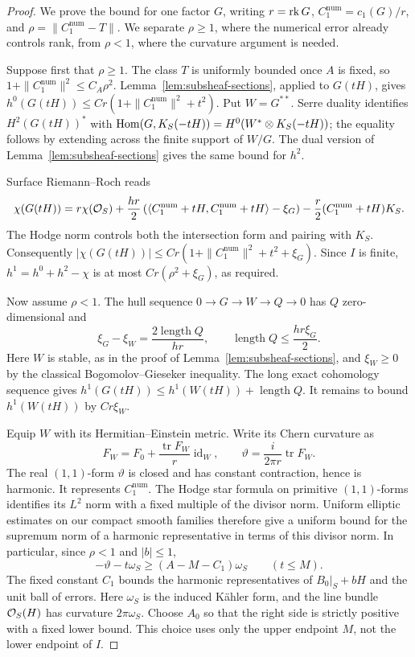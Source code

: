\begin{proof}
We prove the bound for one factor $G$, writing
$r=\operatorname{rk} G$, $C_1^{\mathrm{num}}=c_1(G)/r$, and
$\rho=\|C_1^{\mathrm{num}}-T\|$.  We separate $\rho\ge1$,
where the numerical error already controls rank, from $\rho<1$,
where the curvature argument is needed.

Suppose first that $\rho\ge1$.  The class $T$ is uniformly bounded
once $A$ is fixed, so $1+\|C_1^{\mathrm{num}}\|^2\le C_A\rho^2$.
Lemma~\ref{lem:subsheaf-sections}, applied to $G(tH)$, gives
$h^0(G(tH))\le Cr(1+\|C_1^{\mathrm{num}}\|^2+t^2)$.
Put $W=G^{**}$.  Serre duality identifies $H^2(G(tH))^*$ with
$\operatorname{Hom}(G,K_S(-tH))=H^0(W^*\otimes K_S(-tH))$; the equality follows
by extending across the finite support of $W/G$.
The dual version of Lemma~\ref{lem:subsheaf-sections} gives the
same bound for $h^2$.

Surface Riemann--Roch reads
\[
 \chi(G(tH))
 =r\chi(\mathcal O_S)+\frac{hr}{2}
   \left(\langle C_1^{\mathrm{num}}+tH,
                    C_1^{\mathrm{num}}+tH\rangle-\xi_G\right)
   -\frac r2(C_1^{\mathrm{num}}+tH)K_S.
\]
The Hodge norm controls both the intersection form and pairing
with $K_S$.  Consequently
$|\chi(G(tH))|\le Cr(1+\|C_1^{\mathrm{num}}\|^2+t^2+\xi_G)$.
Since $I$ is finite, $h^1=h^0+h^2-\chi$ is at most
$Cr(\rho^2+\xi_G)$, as required.

Now assume $\rho<1$.  The hull sequence
$0\to G\to W\to Q\to0$ has $Q$ zero-dimensional and
\begin{equation}\label{eq:hull-length}
 \xi_G-\xi_W=\frac{2\operatorname{length}Q}{hr},
 \qquad
 \operatorname{length}Q\le\frac{hr\xi_G}{2}.
\end{equation}
Here $W$ is stable, as in the proof of
Lemma~\ref{lem:subsheaf-sections}, and $\xi_W\ge0$ by the
classical Bogomolov--Gieseker inequality.  The long exact
cohomology sequence gives
$h^1(G(tH))\le h^1(W(tH))+\operatorname{length}Q$.
It remains to bound $h^1(W(tH))$ by $Cr\xi_W$.

Equip $W$ with its Hermitian--Einstein metric.  Write its Chern
curvature as
\[
 F_W=F_0+\frac{\operatorname{tr}F_W}{r}\operatorname{id}_W,
 \qquad
 \vartheta=\frac{i}{2\pi r}\operatorname{tr}F_W.
\]
The real $(1,1)$-form $\vartheta$ is closed and has constant
contraction, hence is harmonic.  It represents
$C_1^{\mathrm{num}}$.  The Hodge star formula on primitive
$(1,1)$-forms identifies its $L^2$ norm with a fixed multiple of
the divisor norm.  Uniform elliptic estimates on our compact
smooth families therefore give a uniform bound for the supremum
norm of a harmonic representative in terms of this divisor norm.
In particular, since $\rho<1$ and $|b|\le1$,
\begin{equation}\label{eq:central-curvature-positive}
 -\vartheta-t\omega_S\ge(A-M-C_1)\omega_S
 \qquad(t\le M).
\end{equation}
The fixed constant $C_1$ bounds the harmonic representatives of
$B_0|_S+bH$ and the unit ball of errors.  Here $\omega_S$ is the
induced Kähler form, and the line bundle $\mathcal O_S(H)$ has curvature
$2\pi\omega_S$.  Choose $A_0$ so that the right side is strictly
positive with a fixed lower bound.  This choice uses only the
upper endpoint $M$, not the lower endpoint of $I$.


\end{proof}
